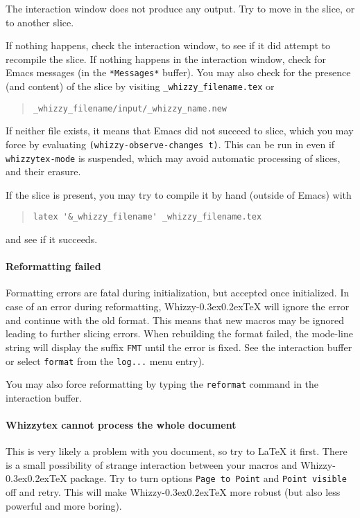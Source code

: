 \documentclass[12pt]{article}
\makeatletter
\let \lst \verb
\def \whizzy {{Whizzy\kern -0.3ex\raise 0.2ex\hbox{\let \@\relax\TeX}}}
\makeatother
\begin{document}
The interaction window does not produce any output. 
Try to move in the slice, or to another slice. 

If nothing happens, check the interaction
window, to see if it did attempt to recompile the slice.
If nothing happens in the interaction window, check for Emacs messages
(in the \lst"*Messages*" buffer). You may also check for the presence 
(and content) of the slice by visiting 
\lst"_whizzy_filename.tex" or
\begin{quote}
\begin{verbatim}
_whizzy_filename/input/_whizzy_name.new
\end{verbatim}
\end{quote}
If neither file exists, it means that Emacs did
not succeed to slice, which you may force by evaluating
\lst"(whizzy-observe-changes t)". 
This can be run in even if {\tt whizzytex-mode} is suspended, which may
avoid automatic processing of slices, and their erasure.

If the slice is present, you may try to compile it by hand (outside of
Emacs) with 
\begin{quote}
\begin{verbatim}
latex '&_whizzy_filename' _whizzy_filename.tex
\end{verbatim}
\end{quote}
and see if it succeeds. 


\paragraph {Reformatting failed}

Formatting errors are fatal during initialization, but accepted once
initialized. In case of an error during reformatting, {\whizzy} will ignore
the error and continue with the old format.  This means that new macros may
be ignored leading to further slicing errors. When rebuilding the format
failed, the mode-line string will display the suffix \lst"FMT" until the
error is fixed.  See the interaction buffer or select \lst"format" from the
\lst"log..." menu entry).

You may also force reformatting by typing the \lst"reformat" command
in the interaction buffer. 


\paragraph {Whizzytex cannot process the whole document}

This is very likely a problem with you document, so try to {\LaTeX} it 
first. There is a small possibility of strange interaction between
your macros and {\whizzy} package. Try to turn options 
{\tt Page to Point} and {\tt Point visible} off and retry. 
This will make {\whizzy} more robust (but also less powerful and more
boring). 
\end{document}
